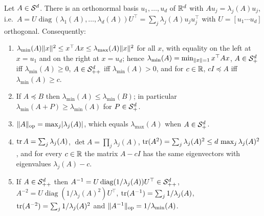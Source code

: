 \begin{lemma}\label{lem:eigen_quadratic_bounds}
Let $A \in \mathcal{S}^{d}$. There is an orthonormal basis $u_1, \dots, u_d$ of $\mathbb{R}^d$ with
$A u_j = \lambda_j(A) u_j$, i.e.\ $A = U \operatorname{diag}(\lambda_1(A),\dots,\lambda_d(A))
U^\top = \sum_j \lambda_j(A) u_j u_j^\top$ with $U = [u_1 \cdots u_d]$ orthogonal. Consequently:
\begin{enumerate}
  \item[(i)] $\lambda_{\min}(A)\lVert x \rVert^2 \le x^\top A x \le \lambda_{\max}(A)\lVert x \rVert^2$ for all
        $x$, with equality on the left at $x = u_1$ and on the right at $x = u_d$; hence
        $\lambda_{\min}(A) = \min_{\lVert x \rVert = 1} x^\top A x$, $A \in \mathcal{S}_{+}^{d}$ iff
        $\lambda_{\min}(A) \ge 0$, $A \in \mathcal{S}_{++}^{d}$ iff $\lambda_{\min}(A) > 0$, and for $c \in \mathbb{R}$,
        $cI \preceq A$ iff $\lambda_{\min}(A) \ge c$.
  \item[(ii)] If $A \preceq B$ then $\lambda_{\min}(A) \le \lambda_{\min}(B)$; in particular
        $\lambda_{\min}(A + P) \ge \lambda_{\min}(A)$ for $P \in \mathcal{S}_{+}^{d}$.
  \item[(iii)] $\lVert A \rVert_{\mathrm{op}} = \max_j \lvert \lambda_j(A) \rvert$, which equals
        $\lambda_{\max}(A)$ when $A \in \mathcal{S}_{+}^{d}$.
  \item[(iv)] $\operatorname{tr} A = \sum_j \lambda_j(A)$, $\det A = \prod_j \lambda_j(A)$,
        $\operatorname{tr}(A^2) = \sum_j \lambda_j(A)^2 \le d\,\max_j\lambda_j(A)^2$, and for every $c \in \mathbb{R}$
        the matrix $A - cI$ has the same eigenvectors with eigenvalues $\lambda_j(A) - c$.
  \item[(v)] If $A \in \mathcal{S}_{++}^{d}$ then $A^{-1} = U \operatorname{diag}(1/\lambda_j(A)) U^\top \in \mathcal{S}_{++}^{d}$,
        $A^{-2} = U\operatorname{diag}(1/\lambda_j(A)^2)U^\top$, $\operatorname{tr}(A^{-1}) = \sum_j 1/\lambda_j(A)$,
        $\operatorname{tr}(A^{-2}) = \sum_j 1/\lambda_j(A)^2$ and $\lVert A^{-1} \rVert_{\mathrm{op}} =
        1/\lambda_{\min}(A)$.
\end{enumerate}
\end{lemma}

